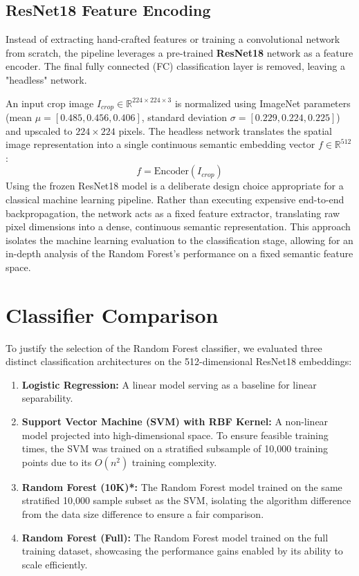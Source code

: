 \documentclass[11pt,a4paper]{article}
\begin{document}
\subsection{ResNet18 Feature Encoding}
Instead of extracting hand-crafted features or training a convolutional network from scratch, the pipeline leverages a pre-trained \textbf{ResNet18} network as a feature encoder. The final fully connected (FC) classification layer is removed, leaving a "headless" network.

An input crop image $I_{crop} \in \mathbb{R}^{224 \times 224 \times 3}$ is normalized using ImageNet parameters (mean $\mu = [0.485, 0.456, 0.406]$, standard deviation $\sigma = [0.229, 0.224, 0.225]$) and upscaled to $224 \times 224$ pixels. The headless network translates the spatial image representation into a single continuous semantic embedding vector $f \in \mathbb{R}^{512}$:
\begin{equation}
f = \text{Encoder}(I_{crop})
\end{equation}
Using the frozen ResNet18 model is a deliberate design choice appropriate for a classical machine learning pipeline. Rather than executing expensive end-to-end backpropagation, the network acts as a fixed feature extractor, translating raw pixel dimensions into a dense, continuous semantic representation. This approach isolates the machine learning evaluation to the classification stage, allowing for an in-depth analysis of the Random Forest's performance on a fixed semantic feature space.
\section{Classifier Comparison}
\label{sec:classifier_comparison}
To justify the selection of the Random Forest classifier, we evaluated three distinct classification architectures on the 512-dimensional ResNet18 embeddings:
\begin{enumerate}
  \item \textbf{Logistic Regression:} A linear model serving as a baseline for linear separability.
  \item \textbf{Support Vector Machine (SVM) with RBF Kernel:} A non-linear model projected into high-dimensional space. To ensure feasible training times, the SVM was trained on a stratified subsample of 10,000 training points due to its $O(n^2)$ training complexity.
  \item \textbf{Random Forest (10K)*:} The Random Forest model trained on the same stratified 10,000 sample subset as the SVM, isolating the algorithm difference from the data size difference to ensure a fair comparison.
  \item \textbf{Random Forest (Full):} The Random Forest model trained on the full training dataset, showcasing the performance gains enabled by its ability to scale efficiently.
\end{enumerate}
\end{document}
